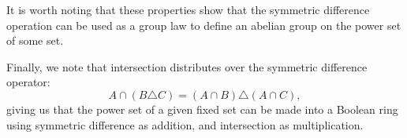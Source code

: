 \documentclass{article}
\newcommand{\symd}{\triangle}
\begin{document}
It is worth noting that these properties show that the symmetric difference operation can be used as a group law to define an abelian group on the power set of some  set.  

Finally, we note that intersection distributes over the symmetric difference operator: $$A\cap(B\symd C)=(A\cap B)\symd(A\cap C),$$ giving us that the power set of a given fixed set can be made into a Boolean ring using symmetric difference as addition, and intersection as multiplication.
\end{document}
